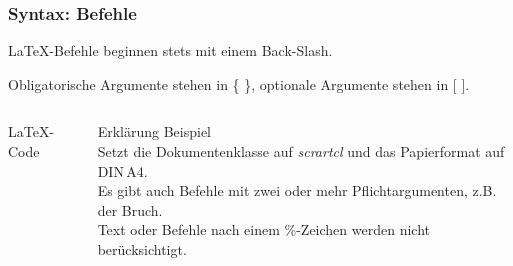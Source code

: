 \begin{frame}[fragile]
    \frametitle{Syntax: Befehle}
    \LaTeX-Befehle beginnen stets mit einem Back-Slash.

    Obligatorische Argumente stehen in \{ \}, optionale Argumente stehen in [ ].
    \begin{columns}[T]
        \begin{column}{0.47\textwidth}
            \begin{block}{\LaTeX-Code}
                \vspace{0.4cm}
            \end{block}
        \end{column}
        \begin{column}{0.47\textwidth}
            \begin{block}{Erklärung}
                Beispiel \\
                Setzt die Dokumentenklasse auf \emph{scrartcl} und das Papierformat auf DIN\,A4. \\
                Es gibt auch Befehle mit zwei oder mehr Pflichtargumenten, z.B. der Bruch. \\
                Text oder Befehle nach einem \%-Zeichen werden nicht berücksichtigt.
            \end{block}
        \end{column}
    \end{columns}
\end{frame}

